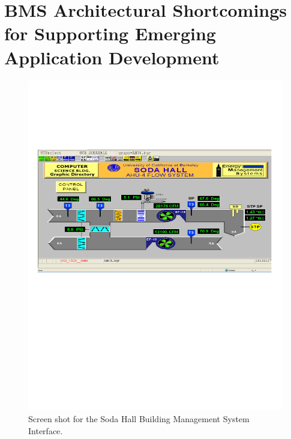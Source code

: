 


\section{BMS Architectural Shortcomings for Supporting Emerging Application Development}

\begin{figure}[t!] %
\centering
\includegraphics[width=0.75\columnwidth]{figs/soda_bms_screenshot}
\caption{Screen shot for the Soda Hall Building Management System Interface.}
\label{fig:soda_bms_screenshot}
\end{figure}


